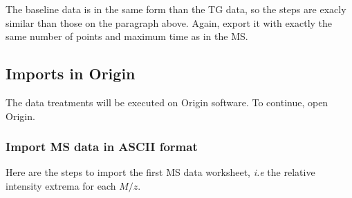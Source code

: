 \documentclass[a4paper, 11pt, raggedright, parskip, sans, colorful]{tufte-style-article}
\begin{document}
The baseline data is in the same form than the TG data, so the steps are exacly similar than those on the paragraph above. Again, export it with exactly the same number of points and maximum time as in the MS.


\subsection{Imports in Origin}

The data treatments will be executed on Origin software. To continue, open Origin.


\subsubsection{Import MS data in ASCII format}

Here are the steps to import the first MS data worksheet, \textit{i.e} the relative intensity extrema for each $M/z$.
\end{document}
